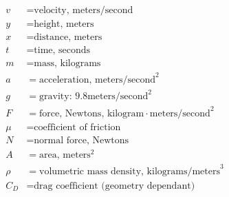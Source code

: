 \documentclass[12pt, letterpaper]{book}
\begin{document}
    \begin{align*}
        v       & = \text{velocity, meters/second}                                  \\
        y       & = \text{height, meters}                                           \\
        x       & = \text{distance, meters}                                         \\
        t       & = \text{time, seconds}                                            \\
        m       & = \text{mass, kilograms}                                          \\
        a       & = \text{acceleration, } \text{meters/second}^{2}                  \\
        g       & = \text{gravity: } 9.8 \text{meters/second}^{2}                   \\
        F       & = \text{force, Newtons, kilogram} \cdot \text{meters/second}^{2}  \\
        \mu     & = \text{coefficient of friction}                                  \\
        N       & = \text{normal force, Newtons}                                    \\
        A       & = \text{area, meters}^{2}                                         \\
        \rho    & = \text{volumetric mass density, kilograms/meters}^{3}            \\
        C_{D}   & = \text{drag coefficient (geometry dependant)}
    \end{align*}
\end{document}
